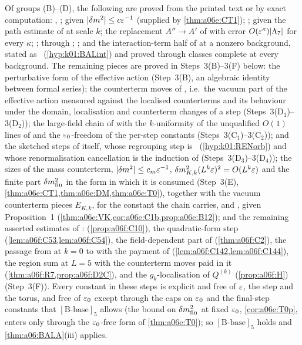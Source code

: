 Of groups (B)--(D), the following are proved from the printed text or by exact computation: \cite[(3.20)--(3.21)]{Ba1}, \cite[(3.66)--(3.69)]{Ba1}; \cite[(2.11)--(2.13)]{Ba2} given $|{\delta m^2}|\le c\varepsilon^{-1}$ (supplied by \cref{thm:a06e:CT1}); \cite[Prop.~2.2]{Ba2}; \cite[Lemma~2.7]{Ba2} given the path estimate of \cite[p.~560]{Ba2} at scale $k$; the replacement $A''\to A'$ of \cite[pp.~561--562]{Ba2} with error $O(\varepsilon^\kappa)|\Lambda_7|$ for every $\kappa$; \cite[(2.78)]{Ba2}; \cite[(3.29)]{Ba2} through \cite[Prop.~3.1$'$]{Ba4}; \cite[p.~438]{Ba3}; and the interaction-term half of \cite[Prop.~2.6]{Ba2} at a nonzero background, stated as \BALint\ (\cref{hyp:k01:BALint}) and proved through classes complete at every background. The remaining pieces are proved in Steps~3(B)--3(F) below: the perturbative form of the effective action \cite[(3.34)--(3.36)]{Ba1} (Step~3(B), an algebraic identity between formal series); the counterterm moves of \cite[pp.~411--422]{Ba3}, i.e.\ the vacuum part of the effective action measured against the localised counterterms and its behaviour under the domain, localisation and counterterm changes of a step (Steps~3(D$_1$)--3(D$_2$)); the large-field chain of \cite[Sect.~3A]{Ba2} with the $k$-uniformity of the unqualified $O(1)$ lines of \cite{Ba2} and the $\varepsilon_0$-freedom of the per-step constants (Steps~3(C$_1$)--3(C$_2$)); and the sketched steps of \cite[Prop.~1]{Ba3} itself, whose regrouping step is \RENorb\ (\cref{hyp:k01:RENorb}) and whose renormalisation cancellation is the induction of \cite[pp.~444--445]{Ba3} (Steps~3(D$_3$)--3(D$_4$)); the sizes of the mass counterterm, $|\delta m^2|\le c_m\varepsilon^{-1}$, $\delta m^2_{K,k}(L^k\varepsilon)^2=O(L^k\varepsilon)$ and the finite part $\delta m^2_{\mathrm{fin}}$ in the form in which it is consumed (Step~3(E), \cref{thm:a06e:CT1,thm:a06e:DM,thm:a06e:T0}), together with the vacuum counterterm pieces $E_{K,k}$, \cite[(2.14)]{Ba2} for the constant the chain carries, and \cite[Props.~3.1--3.2]{Ba1}, \cite[p.~579]{Ba2} given Proposition~1 (\cref{thm:a06e:VK,cor:a06e:C1b,prop:a06e:B12}); and the remaining asserted estimates of \cite[Sects.~2--3]{Ba2}: \cite[p.~568, (2.47)]{Ba2} (\cref{prop:a06f:C10}), the quadratic-form step \cite[(2.108)--(2.109)]{Ba2} (\cref{lem:a06f:C53,lem:a06f:C54}), the field-dependent part of \cite[Prop.~2.1, (2.57)]{Ba2} (\cref{thm:a06f:C2}), the passage from \cite[(3.5)]{Ba2} at $k=0$ to \cite[(3.21)]{Ba2} with the payment of \cite[Sect.~3C]{Ba2} (\cref{lem:a06f:C142,lem:a06f:C144}), the region sum \cite[(3.42)]{Ba2} at $L=5$ with the counterterm moves paid in it (\cref{thm:a06f:R7,prop:a06f:D2C}), and the $g_k$-localisation of $Q^{(k)}$ \cite[p.~579]{Ba2} (\cref{prop:a06f:H}) (Step~3(F)). Every constant in these steps is explicit and free of $\varepsilon$, the step and the torus, and free of $\varepsilon_0$ except through the caps on $\varepsilon_0$ and the final-step constants that $[\mathrm B\text{-base}]_5$ allows (the bound on $\delta m^2_{\mathrm{fin}}$ at fixed $\varepsilon_0$, \cref{cor:a06e:T0p}, enters only through the $\varepsilon_0$-free form of \cref{thm:a06e:T0}); so $[\mathrm B\text{-base}]_5$ holds and \cref{thm:a06:BALA}(iii) applies.

